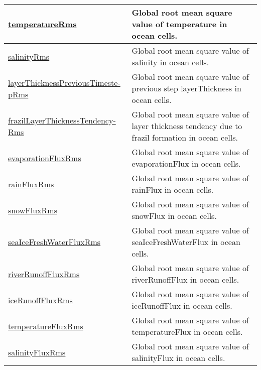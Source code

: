 {\begin{center}
\begin{longtable}{| p{2.0in} | p{4.0in} |}
    \hline
    \hyperref[subsec:var_sec_globalStatsAM_temperatureRms]{temperatureRms} & Global root mean square value of temperature in ocean cells. \\
    \hline
    \hyperref[subsec:var_sec_globalStatsAM_salinityRms]{salinityRms} & Global root mean square value of salinity in ocean cells. \\
    \hline
    \hyperref[subsec:var_sec_globalStatsAM_layerThicknessPreviousTimestepRms]{layerThicknessPreviousTimeste-}\hyperref[subsec:var_sec_globalStatsAM_layerThicknessPreviousTimestepRms]{pRms}  & Global root mean square value of previous step layerThickness in ocean cells. \\
    \hline
    \hyperref[subsec:var_sec_globalStatsAM_frazilLayerThicknessTendencyRms]{frazilLayerThicknessTendency-}\hyperref[subsec:var_sec_globalStatsAM_frazilLayerThicknessTendencyRms]{Rms}  & Global root mean square value of layer thickness tendency due to frazil formation in ocean cells. \\
    \hline
    \hyperref[subsec:var_sec_globalStatsAM_evaporationFluxRms]{evaporationFluxRms} & Global root mean square value of evaporationFlux in ocean cells. \\
    \hline
    \hyperref[subsec:var_sec_globalStatsAM_rainFluxRms]{rainFluxRms} & Global root mean square value of rainFlux in ocean cells. \\
    \hline
    \hyperref[subsec:var_sec_globalStatsAM_snowFluxRms]{snowFluxRms} & Global root mean square value of snowFlux in ocean cells. \\
    \hline
    \hyperref[subsec:var_sec_globalStatsAM_seaIceFreshWaterFluxRms]{seaIceFreshWaterFluxRms} & Global root mean square value of seaIceFreshWaterFlux in ocean cells. \\
    \hline
    \hyperref[subsec:var_sec_globalStatsAM_riverRunoffFluxRms]{riverRunoffFluxRms} & Global root mean square value of riverRunoffFlux in ocean cells. \\
    \hline
    \hyperref[subsec:var_sec_globalStatsAM_iceRunoffFluxRms]{iceRunoffFluxRms} & Global root mean square value of iceRunoffFlux in ocean cells. \\
    \hline
    \hyperref[subsec:var_sec_globalStatsAM_temperatureFluxRms]{temperatureFluxRms} & Global root mean square value of temperatureFlux in ocean cells. \\
    \hline
    \hyperref[subsec:var_sec_globalStatsAM_salinityFluxRms]{salinityFluxRms} & Global root mean square value of salinityFlux in ocean cells. \\

\end{longtable}
\end{center}}
